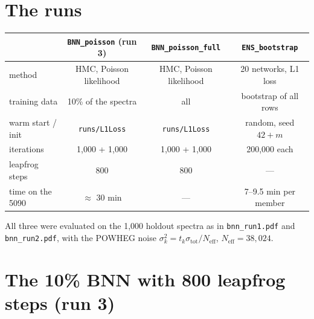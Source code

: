 \documentclass[11pt]{article}
\newcommand{\file}[1]{\nolinkurl{#1}}
\begin{document}
\tableofcontents

\section{The runs}

\begin{center}
\small
\begin{tabular}{lccc}
\toprule
& \file{BNN_poisson} (run 3) & \file{BNN_poisson_full} & \file{ENS_bootstrap}\\
\midrule
method & HMC, Poisson likelihood & HMC, Poisson likelihood & 20 networks, L1 loss\\
training data & 10\% of the spectra & all & bootstrap of all rows\\
warm start / init & \file{runs/L1Loss} & \file{runs/L1Loss} & random, seed $42 + m$\\
iterations & 1,000 + 1,000 & 1,000 + 1,000 & 200,000 each\\
leapfrog steps & 800 & 800 & ---\\
time on the 5090 & $\approx$ 30 min & --- & 7--9.5 min per member\\
\bottomrule
\end{tabular}
\end{center}

\noindent All three were evaluated on the 1,000 holdout spectra as in \file{bnn_run1.pdf}
and \file{bnn_run2.pdf}, with the POWHEG noise $\sigma_k^2 = t_k \sigma_\text{tot}/N_\text{eff}$,
$N_\text{eff} = 38{,}024$.

\section{The 10\% BNN with 800 leapfrog steps (run 3)}
\label{sec:run3}
\end{document}
